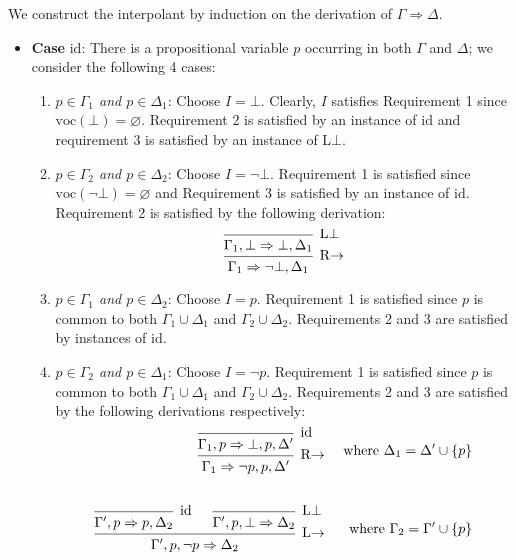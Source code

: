\documentclass[a4paper]{article}
\newcommand{\voc}{\mathrm{voc}}
\newcommand{\id}{\mathrm{id}}
\begin{document}
We construct the interpolant by induction on the derivation of $\Gamma \Rightarrow \Delta$.
\begin{itemize}
\item \textbf{Case} $\id$: There is a propositional variable $p$ occurring in both $\Gamma$ and $\Delta$; we consider the following 4 cases:
  \begin{enumerate}
  \item \emph{$p \in \Gamma_1$ and $p \in \Delta_1$}: Choose $I = \bot$.
    Clearly, $I$ satisfies Requirement 1 since $\voc(\bot) = \varnothing$.
    Requirement 2 is satisfied by an instance of $\id$ and requirement 3 is satisfied by an instance of L$\bot$.
  \item \emph{$p \in \Gamma_2$ and $p \in \Delta_2$}: Choose $I = \lnot\bot$.
    Requirement 1 is satisfied since $\voc(\lnot\bot) = \varnothing$ and Requirement 3 is satisfied by an instance of $\id$.
    Requirement 2 is satisfied by the following derivation:
    \[
      \begin{prooftree}
        \infer0[L$\bot$]{\Gamma_1,\bot \Rightarrow \bot,\Delta_1}
        \infer1[R$\to$]{\Gamma_1 \Rightarrow \lnot\bot,\Delta_1}
      \end{prooftree}
    \]
  \item \emph{$p \in \Gamma_1$ and $p \in \Delta_2$}: Choose $I = p$.
    Requirement 1 is satisfied since $p$ is common to both $\Gamma_1 \cup \Delta_1$ and $\Gamma_2 \cup \Delta_2$.
    Requirements 2 and 3 are satisfied by instances of $\id$.
  \item \emph{$p \in \Gamma_2$ and $p \in \Delta_1$}: Choose $I = \lnot p$.
    Requirement 1 is satisfied since $p$ is common to both $\Gamma_1 \cup \Delta_1$ and $\Gamma_2 \cup \Delta_2$.
    Requirements 2 and 3 are satisfied by the following derivations respectively:
    \begin{align*}
      \begin{prooftree}
        \infer0[$\id$]{\Gamma_1,p \Rightarrow \bot,p,\Delta'}
        \infer1[R$\to$]{\Gamma_1 \Rightarrow \lnot p,p,\Delta'}
      \end{prooftree}
      && \text{ where $\Delta_1 = \Delta' \cup \{p\}$}\\[2em]
      \begin{prooftree}
        \infer0[$\id$]{\Gamma',p \Rightarrow p, \Delta_2}
        \infer0[L$\bot$]{\Gamma',p,\bot \Rightarrow \Delta_2}
        \infer2[L$\to$]{\Gamma',p,\lnot p \Rightarrow \Delta_2}
      \end{prooftree}
      && \text{ where $\Gamma_2 = \Gamma' \cup \{p\}$}\\

\end{align*}
\end{enumerate}
\end{itemize}
\end{document}
